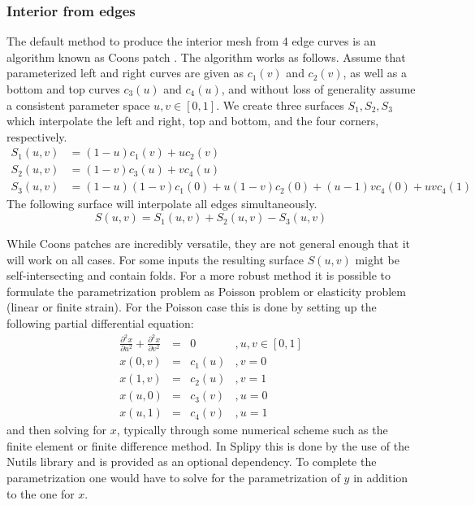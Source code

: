 \documentclass[preprint,12pt, a4paper]{elsarticle}
\begin{document}
\subsubsection{Interior from edges}
\label{sec:interior-from-edges}
The default method to produce the interior mesh from 4 edge curves is an algorithm known as Coons patch \cite{coons1967sfc}.
The algorithm works as follows.
Assume that parameterized left and right curves are given as $c_1(v)$ and $c_2(v)$, as well as a bottom and top curves $c_3(u)$ and $c_4(u)$, and without loss of generality assume a consistent parameter space $u,v\in[0,1]$.
We create three surfaces $S_1, S_2, S_3$ which interpolate the left and right, top and bottom, and the four corners, respectively.
\begin{align*}
    S_1(u,v) & = (1-u)c_1(v) + uc_2(v) \\
    S_2(u,v) & = (1-v)c_3(u) + vc_4(u) \\
    S_3(u,v) & = (1-u)(1-v)c_1(0) + u(1-v)c_2(0) + (u-1)vc_4(0) + uvc_4(1)
\end{align*}
The following surface will interpolate all edges simultaneously.
\begin{equation}
    S(u,v) = S_1(u,v) + S_2(u,v) - S_3(u,v)
\end{equation}

While Coons patches are incredibly versatile, they are not general enough that it will work on all cases.
For some inputs the resulting surface $S(u,v)$ might be self-intersecting and contain folds.
For a more robust method it is possible to formulate the parametrization problem as Poisson problem or elasticity problem (linear or finite strain).
For the Poisson case this is done by setting up the following partial differential equation:
\begin{equation}
    \begin{array}{rcll}
    \frac{\partial^2 x}{\partial u^2} + \frac{\partial^2 x}{\partial v^2} & = & 0 &, u,v\in [0,1] \\
    x(0,v) & = & c_1(u) &, v = 0 \\
    x(1,v) & = & c_2(u) &, v = 1 \\
    x(u,0) & = & c_3(v) &, u = 0 \\
    x(u,1) & = & c_4(v) &, u = 1
    \end{array}
\end{equation}
and then solving for $x$, typically through some numerical scheme such as the finite element or finite difference method.
In Splipy this is done by the use of the Nutils library \cite{van_zwieten2018n} and is provided as an optional dependency.
To complete the parametrization one would have to solve for the parametrization of $y$ in addition to the one for $x$.
\end{document}
